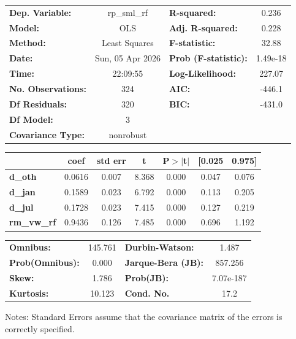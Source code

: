 \begin{center}
\begin{tabular}{lclc}
\toprule
\textbf{Dep. Variable:}    &   rp\_sml\_rf    & \textbf{  R-squared:         } &     0.236   \\
\textbf{Model:}            &       OLS        & \textbf{  Adj. R-squared:    } &     0.228   \\
\textbf{Method:}           &  Least Squares   & \textbf{  F-statistic:       } &     32.88   \\
\textbf{Date:}             & Sun, 05 Apr 2026 & \textbf{  Prob (F-statistic):} &  1.49e-18   \\
\textbf{Time:}             &     22:09:55     & \textbf{  Log-Likelihood:    } &    227.07   \\
\textbf{No. Observations:} &         324      & \textbf{  AIC:               } &    -446.1   \\
\textbf{Df Residuals:}     &         320      & \textbf{  BIC:               } &    -431.0   \\
\textbf{Df Model:}         &           3      & \textbf{                     } &             \\
\textbf{Covariance Type:}  &    nonrobust     & \textbf{                     } &             \\
\bottomrule
\end{tabular}
\begin{tabular}{lcccccc}
                    & \textbf{coef} & \textbf{std err} & \textbf{t} & \textbf{P$> |$t$|$} & \textbf{[0.025} & \textbf{0.975]}  \\
\midrule
\textbf{d\_oth}     &       0.0616  &        0.007     &     8.368  &         0.000        &        0.047    &        0.076     \\
\textbf{d\_jan}     &       0.1589  &        0.023     &     6.792  &         0.000        &        0.113    &        0.205     \\
\textbf{d\_jul}     &       0.1728  &        0.023     &     7.415  &         0.000        &        0.127    &        0.219     \\
\textbf{rm\_vw\_rf} &       0.9436  &        0.126     &     7.485  &         0.000        &        0.696    &        1.192     \\
\bottomrule
\end{tabular}
\begin{tabular}{lclc}
\textbf{Omnibus:}       & 145.761 & \textbf{  Durbin-Watson:     } &     1.487  \\
\textbf{Prob(Omnibus):} &   0.000 & \textbf{  Jarque-Bera (JB):  } &   857.256  \\
\textbf{Skew:}          &   1.786 & \textbf{  Prob(JB):          } & 7.07e-187  \\
\textbf{Kurtosis:}      &  10.123 & \textbf{  Cond. No.          } &      17.2  \\
\bottomrule
\end{tabular}
\end{center}

Notes: \newline
 [1] Standard Errors assume that the covariance matrix of the errors is correctly specified.